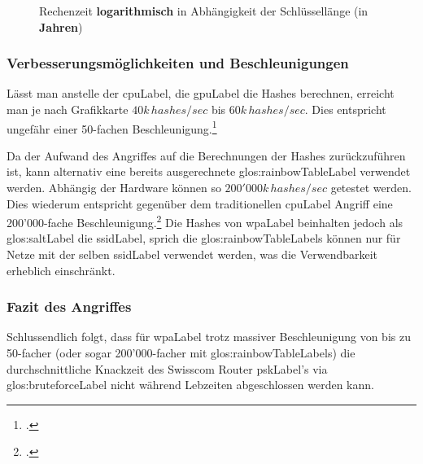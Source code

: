 \begin{figure}[H]
	\begin{minipage}[b]{.65\linewidth}
		\pgfplotsset{width=1.0\textwidth, height=0.7\textwidth}
		\centering
	\end{minipage}
	\caption[Rechenzeit logarithmisch in Abhängigkeit der Schlüssellänge]{Rechenzeit \textbf{logarithmisch} in Abhängigkeit der Schlüssellänge (in \textbf{Jahren})}\label{fig:}
	\label{fig:wpa_attack_log}
\end{figure}


\subsubsection{Verbesserungsmöglichkeiten und Beschleunigungen}
Lässt man anstelle der \gls{cpuLabel}, die \gls{gpuLabel} die Hashes berechnen, erreicht man je nach Grafikkarte $40k\,hashes/sec$ bis $60k\,hashes/sec$. Dies entspricht ungefähr einer 50-fachen Beschleunigung.\footcite[][158]{WrightCache201503}

Da der Aufwand des Angriffes auf die Berechnungen der Hashes zurückzuführen ist, kann alternativ eine bereits ausgerechnete \gls{glos:rainbowTableLabel} verwendet werden.
Abhängig der Hardware können so $200'000k\,hashes/sec$ getestet werden. Dies wiederum entspricht gegenüber dem traditionellen \gls{cpuLabel} Angriff eine 200'000-fache Beschleunigung.\footcite[][160]{WrightCache201503}
Die Hashes von \gls{wpaLabel} beinhalten jedoch als \gls{glos:saltLabel} die \gls{ssidLabel}, sprich die \glspl{glos:rainbowTableLabel} können nur für Netze mit der selben \gls{ssidLabel} verwendet werden, was die Verwendbarkeit erheblich einschränkt.


\subsubsection{Fazit des Angriffes}
Schlussendlich folgt, dass für \gls{wpaLabel} trotz massiver Beschleunigung von bis zu 50-facher (oder sogar 200'000-facher mit \glspl{glos:rainbowTableLabel}) die durchschnittliche Knackzeit des Swisscom Router \gls{pskLabel}'s via \gls{glos:bruteforceLabel} nicht während Lebzeiten abgeschlossen werden kann.

